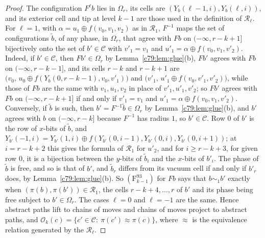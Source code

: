 \begin{proof}
 The configuration $F^\ell b$ lies in $\Omega_r$, its cells are $(Y_b(\ell-1,i),Y_b(\ell,i))$, and its exterior cell and tip at level $k-1$ are those used in the definition of $\mathcal R_\ell$. For $\ell=1$, with $\alpha=u_1\oplus f(v_0,v_1,v_2)$ as in $\mathcal R_1$, $F^{-1}$ maps the set of configurations $\tilde b$, of any phase, in $\Omega_r$, that agree with $Fb$ on $(-\infty,r-k+1]$ bijectively onto the set of $b'\in\mathcal C$ with $v'_1=v_1$ and $u'_1=\alpha\oplus f(v_0,v_1,v'_2)$. Indeed, if $b'\in\mathcal C$, then $Fb'\in\Omega_r$ by Lemma~\ref{c79:lem:glue}(b), $Fb'$ agrees with $Fb$ on $(-\infty,r-k-1]$, and its cells $r-k$ and $r-k+1$ are $\bigl(v_0,\,u_0\oplus f(Y_b(0,r-k-1),v_0,v'_1)\bigr)$ and $\bigl(v'_1,\,u'_1\oplus f(v_0,v'_1,v'_2)\bigr)$, while those of $Fb$ are the same with $v_1,u_1,v_2$ in place of $v'_1,u'_1,v'_2$; so $Fb'$ agrees with $Fb$ on $(-\infty,r-k+1]$ if and only if $v'_1=v_1$ and $u'_1=\alpha\oplus f(v_0,v_1,v'_2)$. Conversely, if $\tilde b$ is such, then $b'=F^{-1}\tilde b\in\Omega_r$ by Lemma~\ref{c79:lem:glue}(b), and $b'$ agrees with $b$ on $(-\infty,r-k]$ because $F^{-1}$ has radius $1$, so $b'\in\mathcal C$. Row $0$ of $b'$ is the row of $x$-bits of $\tilde b$, and $Y_{b'}(-1,i)=Y_{b'}(1,i)\oplus f(Y_{b'}(0,i-1),Y_{b'}(0,i),Y_{b'}(0,i+1))$; at $i=r-k+2$ this gives the formula of $\mathcal R_1$ for $u'_2$, and for $i\ge r-k+3$, for given row $0$, it is a bijection between the $y$-bits of $\tilde b_i$ and the $x$-bits of $b'_i$. The phase of $\tilde b$ is free, and so is that of $b'$, and $\tilde b_r$ differs from its vacuum cell if and only if $b'_r$ does, by Lemma~\ref{c79:lem:glue}(b). So $(\mathrm F^{93}_{k-1})$ for $Fb$ says that $b\sim_1b'$ exactly when $(\pi(b),\pi(b'))\in\mathcal R_1$, the cells $r-k+4,\dots,r$ of $b'$ and its phase being free subject to $b'\in\Omega_r$. The cases $\ell=0$ and $\ell=-1$ are the same. Hence abstract paths lift to chains of moves and chains of moves project to abstract paths, and $\mathcal O_k(c)=\{c'\in\mathcal C:\ \pi(c')\approx\pi(c)\}$, where $\approx$ is the equivalence relation generated by the $\mathcal R_\ell$.


\end{proof}
